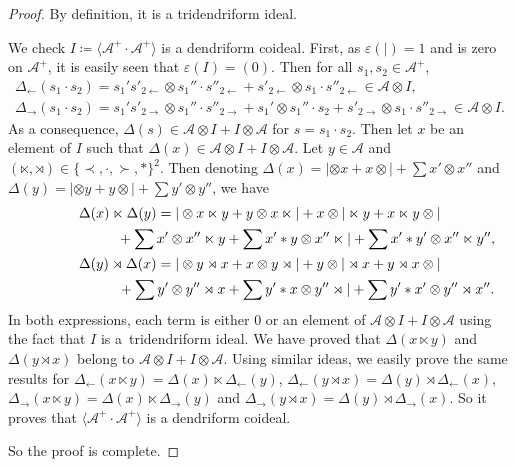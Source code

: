 \documentclass[10pt,a4paper]{amsart}
\numberwithin{equation}{section}
\theoremstyle{definition}
\theoremstyle{plain}
\begin{document}
\begin{proof}
	By definition, it is a tridendriform ideal.
		
We check $I\coloneqq\big\langle \mathcal{A}^+\cdot \mathcal{A}^+ \big\rangle$ is a dendriform coideal.
		First, as $\varepsilon(|)=1$ and is zero on $\mathcal{A}^+$, it is easily seen that $\varepsilon(I)=(0)$. Then for all $s_1,s_2\in \mathcal{A}^+$,
		\begin{gather*}
			\Delta_{\leftarrow}(s_1\cdot s_2)
			=s_1's'_{2 \leftarrow}\otimes s_1''\cdot s''_{2\leftarrow}+s'_{2 \leftarrow}\otimes s_1\cdot s''_{2 \leftarrow} \in \mathcal{A}\otimes I, \\
			\Delta_{\rightarrow}(s_1\cdot s_2)
=s_1's'_{2 \rightarrow}\otimes s_1''\cdot s''_{2 \rightarrow}+s_1'\otimes s_1''\cdot s_2+s'_{2 \rightarrow}\otimes s_1\cdot s''_{2 \rightarrow}\in \mathcal{A}\otimes I.
		\end{gather*}
		As a consequence, $\Delta(s)\in \mathcal{A}\otimes I + I\otimes \mathcal{A}$ for $s=s_1\cdot s_2$. Then let $x$ be an element of $I$ such that $\Delta(x)\in \mathcal{A}\otimes I+I\otimes \mathcal{A}$. Let $y\in \mathcal{A}$ and $(\ltimes,\rtimes)\in\{\prec,\cdot,\succ,*\}^2$. Then denoting $\Delta(x)=|\otimes x+x\otimes |+\sum x'\otimes x''$ and $\Delta(y)=|\otimes y+y\otimes |+\sum y'\otimes y''$, we have
		\begin{gather*}
			\Delta(x)\ltimes \Delta(y) =|\otimes x\ltimes y+y\otimes x\ltimes |+x\otimes |\ltimes y+x\ltimes y\otimes |\\
			 \hphantom{\Delta(x)\ltimes \Delta(y) =}{}+\sum x'\otimes x''\ltimes y+\sum x'*y\otimes x''\ltimes |+\sum x'*y'\otimes x''\ltimes y'', \\
			\Delta(y)\rtimes\Delta(x) =|\otimes y\rtimes x+x\otimes y\rtimes |+y\otimes |\rtimes x+y\rtimes x\otimes |\\
			 \hphantom{\Delta(y)\rtimes\Delta(x) =}{}+\sum y'\otimes y''\rtimes x+\sum y'*x\otimes y''\rtimes |+\sum y'*x'\otimes y''\rtimes x''.
		\end{gather*}
		In both expressions, each term is either $0$ or an element of $\mathcal{A}\otimes I+I\otimes \mathcal{A}$ using the fact that $I$ is a~tridendriform ideal. We have proved that $\Delta(x\ltimes y)$ and $\Delta(y\rtimes x)$ belong to $\mathcal{A}\otimes I+I\otimes \mathcal{A}$. Using similar ideas, we easily prove the same results for $\Delta_{\leftarrow}(x\ltimes y)=\Delta(x)\ltimes \Delta_{\leftarrow}(y)$, $\Delta_{\leftarrow}(y\rtimes x)=\Delta(y)\rtimes \Delta_{\leftarrow}(x)$, $\Delta_{\rightarrow}(x\ltimes y)=\Delta(x)\ltimes \Delta_{\rightarrow}(y)$ and $\Delta_{\rightarrow}(y\rtimes x)=\Delta(y)\rtimes \Delta_{\rightarrow}(x)$. So it proves that $\big\langle \mathcal{A}^+ \cdot \mathcal{A}^+\big\rangle$ is a dendriform coideal.

So the proof is complete.
\end{proof}
\end{document}
